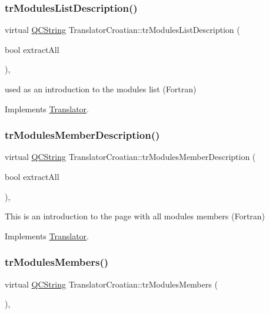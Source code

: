 \subsubsection{\texorpdfstring{trModulesListDescription()}{trModulesListDescription()}}
{\footnotesize\ttfamily virtual \mbox{\hyperlink{class_q_c_string}{Q\+C\+String}} Translator\+Croatian\+::tr\+Modules\+List\+Description (\begin{DoxyParamCaption}\item[{bool}]{extract\+All }\end{DoxyParamCaption})\hspace{0.3cm}{\ttfamily [inline]}, {\ttfamily [virtual]}}

used as an introduction to the modules list (Fortran) 

Implements \mbox{\hyperlink{class_translator}{Translator}}.

\mbox{\label{class_translator_croatian_a6b48597f47640e0cadd1a6c4f551cc49}} 
\subsubsection{\texorpdfstring{trModulesMemberDescription()}{trModulesMemberDescription()}}
{\footnotesize\ttfamily virtual \mbox{\hyperlink{class_q_c_string}{Q\+C\+String}} Translator\+Croatian\+::tr\+Modules\+Member\+Description (\begin{DoxyParamCaption}\item[{bool}]{extract\+All }\end{DoxyParamCaption})\hspace{0.3cm}{\ttfamily [inline]}, {\ttfamily [virtual]}}

This is an introduction to the page with all modules members (Fortran) 

Implements \mbox{\hyperlink{class_translator}{Translator}}.

\mbox{\label{class_translator_croatian_affc180feb6c2ba141af784532b38dad7}} 
\subsubsection{\texorpdfstring{trModulesMembers()}{trModulesMembers()}}
{\footnotesize\ttfamily virtual \mbox{\hyperlink{class_q_c_string}{Q\+C\+String}} Translator\+Croatian\+::tr\+Modules\+Members (\begin{DoxyParamCaption}{ }\end{DoxyParamCaption})\hspace{0.3cm}{\ttfamily [inline]}, {\ttfamily [virtual]}}

